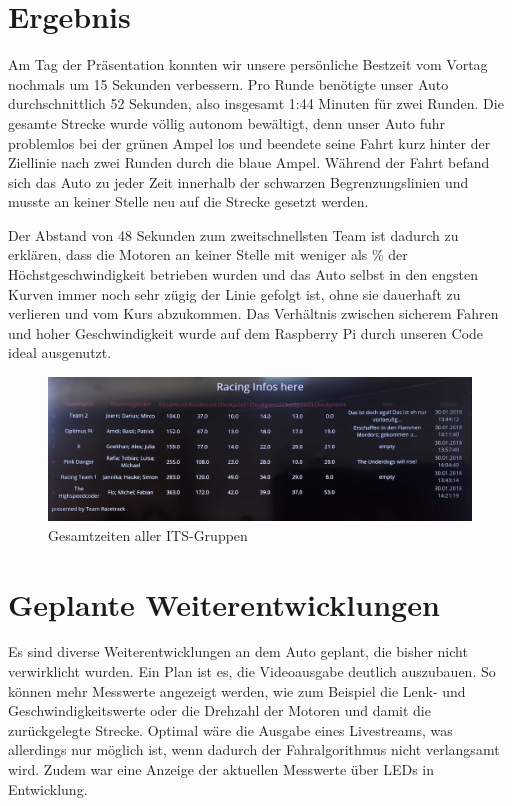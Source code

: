 \documentclass[a4paper, 12pt]{scrartcl}
\begin{document}
\section{Ergebnis}

Am Tag der Präsentation konnten wir unsere persönliche Bestzeit vom Vortag nochmals um 15 Sekunden verbessern. Pro Runde benötigte unser Auto durchschnittlich 52 Sekunden, also insgesamt 1:44 Minuten für zwei Runden. Die gesamte Strecke wurde völlig autonom bewältigt, denn unser Auto fuhr problemlos bei der grünen Ampel los und beendete seine Fahrt kurz hinter der Ziellinie nach zwei Runden durch die blaue Ampel. Während der Fahrt befand sich das Auto zu jeder Zeit innerhalb der schwarzen Begrenzungslinien und musste an keiner Stelle neu auf die Strecke gesetzt werden.

Der Abstand von 48 Sekunden zum zweitschnellsten Team ist dadurch zu erklären, dass die Motoren an keiner Stelle mit weniger als \unit[60]{\%} der Höchstgeschwindigkeit betrieben wurden und das Auto selbst in den engsten Kurven immer noch sehr zügig der Linie gefolgt ist, ohne sie dauerhaft zu verlieren und vom Kurs abzukommen. Das Verhältnis zwischen sicherem Fahren und hoher Geschwindigkeit wurde auf dem Raspberry Pi durch unseren Code ideal ausgenutzt.

\begin{figure}[H]
	\centering
	\includegraphics[width=1\textwidth]{Racing_Infos.jpeg}
	\caption{Gesamtzeiten aller ITS-Gruppen}
\end{figure}


\section{Geplante Weiterentwicklungen}

Es sind diverse Weiterentwicklungen an dem Auto geplant, die bisher nicht verwirklicht wurden.
Ein Plan ist es, die Videoausgabe deutlich auszubauen. So können mehr Messwerte angezeigt werden, wie zum Beispiel die Lenk- und Geschwindigkeitswerte oder die Drehzahl der Motoren und damit die zurückgelegte Strecke. Optimal wäre die Ausgabe eines Livestreams, was allerdings nur möglich ist, wenn dadurch der Fahralgorithmus nicht verlangsamt wird.
Zudem war eine Anzeige der aktuellen Messwerte über LEDs in Entwicklung.
\end{document}
